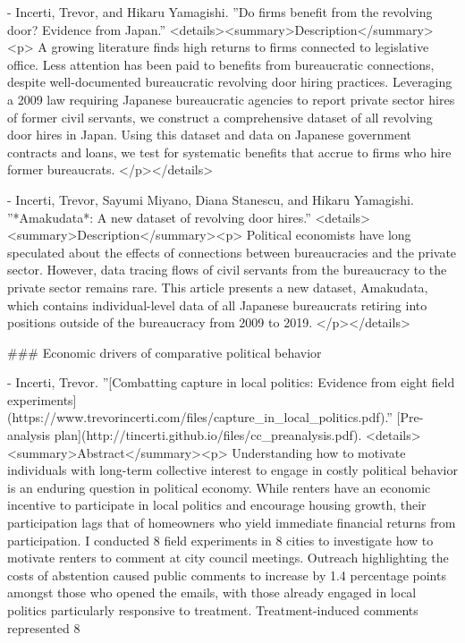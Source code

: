 - Incerti, Trevor, and Hikaru Yamagishi. ''Do firms benefit from the revolving door? Evidence from Japan.''
   <details><summary>Description</summary><p> A growing literature finds high returns to firms connected to legislative office. Less attention has been paid to benefits from bureaucratic connections, despite well-documented bureaucratic revolving door hiring practices. Leveraging a 2009 law requiring Japanese bureaucratic agencies to report private sector hires of former civil servants, we construct a comprehensive dataset of all revolving door hires in Japan. Using this dataset and data on Japanese government contracts and loans, we test for systematic benefits that accrue to firms who hire former bureaucrats. </p></details>
 
- Incerti, Trevor, Sayumi Miyano, Diana Stanescu, and Hikaru Yamagishi. ''*Amakudata*: A new dataset of revolving door hires.''
   <details><summary>Description</summary><p> Political economists have long speculated about the effects of connections between bureaucracies and the private sector. However, data tracing flows of civil servants from the bureaucracy to the private sector remains rare. This article presents a new dataset, Amakudata, which contains individual-level data of all Japanese bureaucrats retiring into positions outside of the bureaucracy from 2009 to 2019. </p></details>
  

### Economic drivers of comparative political behavior
  
  - Incerti, Trevor. ''[Combatting capture in local politics: Evidence from eight field experiments](https://www.trevorincerti.com/files/capture_in_local_politics.pdf).'' [Pre-analysis plan](http://tincerti.github.io/files/cc_preanalysis.pdf).  
   <details><summary>Abstract</summary><p> Understanding how to motivate individuals with long-term collective interest to engage in costly political behavior is an enduring question in political economy. While renters have an economic incentive to participate in local politics and encourage housing growth, their participation lags that of homeowners who yield immediate financial returns from participation. I conducted 8 field experiments in 8 cities to investigate how to motivate renters to comment at city council meetings. Outreach highlighting the costs of abstention caused public comments to increase by 1.4 percentage points amongst those who opened the emails, with those already engaged in local politics particularly responsive to treatment. Treatment-induced comments represented 8%
   

